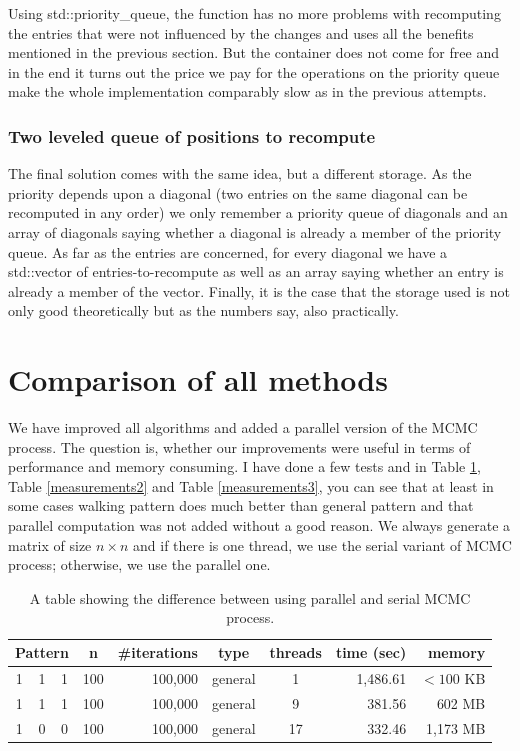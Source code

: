 Using std::priority\_queue, the function has no more problems with recomputing the entries that were not influenced by the changes and uses all the benefits mentioned in the previous section. But the container does not come for free and in the end it turns out the price we pay for the operations on the priority queue make the whole implementation comparably slow as in the previous attempts.
\subsubsection{Two leveled queue of positions to recompute}
The final solution comes with the same idea, but a different storage. As the priority depends upon a diagonal (two entries on the same diagonal can be recomputed in any order) we only remember a priority queue of diagonals and an array of diagonals saying whether a diagonal is already a member of the priority queue. As far as the entries are concerned, for every diagonal we have a std::vector of entries-to-recompute as well as an array saying whether an entry is already a member of the vector. Finally, it is the case that the storage used is not only good theoretically but as the numbers say, also practically.

\section{Comparison of all methods}
We have improved all algorithms and added a parallel version of the MCMC process. The question is, whether our improvements were useful in terms of performance and memory consuming. I have done a few tests and in Table \ref{measurements1}, Table \ref{measurements2} and Table \ref{measurements3}, you can see that at least in some cases walking pattern does much better than general pattern and that parallel computation was not added without a good reason. We always generate a matrix of size $n\times n$ and if there is one thread, we use the serial variant of MCMC process; otherwise, we use the parallel one.
\begin{table}[]
\centering
\begin{tabular}{|ccc|c|r|c|c|r|r|}
\hline
\multicolumn{3}{|c|}{\textbf{Pattern}} & \textbf{n} & \textbf{\#iterations} & \textbf{type} & \textbf{threads} & \textbf{time (sec)} & \textbf{memory} \\ \hline
1 & 1 & 1 & 100 & 100,000 & general & 1 & 1,486.61 & $<100$ KB \\ \cline{4-9} 
1 & 1 & 1 & 100 & 100,000 & general & 9 & 381.56 & 602 MB \\ \cline{4-9} 
1 & 0 & 0 & 100 & 100,000 & general & 17 & 332.46 & 1,173 MB \\ \hline
\end{tabular}
\caption{A table showing the difference between using parallel and serial MCMC process.}
\label{measurements1}
\end{table}

